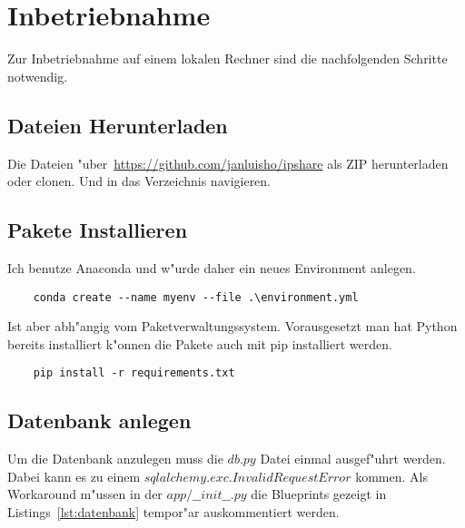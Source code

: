 
\chapter{Inbetriebnahme}\label{ch:inbetriebnahme}
Zur Inbetriebnahme auf einem lokalen Rechner sind die nachfolgenden Schritte notwendig.

\section{Dateien Herunterladen}\label{sec:dateien-herunterladen}
Die Dateien {"u}ber~\url{https://github.com/janluisho/ipshare} als ZIP herunterladen oder clonen.
Und in das Verzeichnis navigieren.

\section{Pakete Installieren}\label{sec:parkete-installieren}
Ich benutze Anaconda und w{"u}rde daher ein neues Environment anlegen.

\vspace{3mm}
\begin{lstlisting}
    conda create --name myenv --file .\environment.yml
\end{lstlisting}
\vspace{3mm}

Ist aber abh{"a}ngig vom Paketverwaltungssystem.
Vorausgesetzt man hat Python bereits installiert k{"o}nnen die Pakete auch mit pip installiert werden.

\vspace{3mm}
\begin{lstlisting}
    pip install -r requirements.txt
\end{lstlisting}
\vspace{3mm}

\section{Datenbank anlegen}\label{sec:datenbank-anlegen}
Um die Datenbank anzulegen muss die $db.py$ Datei einmal ausgef{"u}hrt werden.
Dabei kann es zu einem $sqlalchemy.exc.InvalidRequestError$ kommen.
Als Workaround m{"u}ssen in der $app/\_\_init\_\_.py$ die Blueprints gezeigt in Listings~\ref{lst:datenbank} tempor{"a}r auskommentiert werden.


